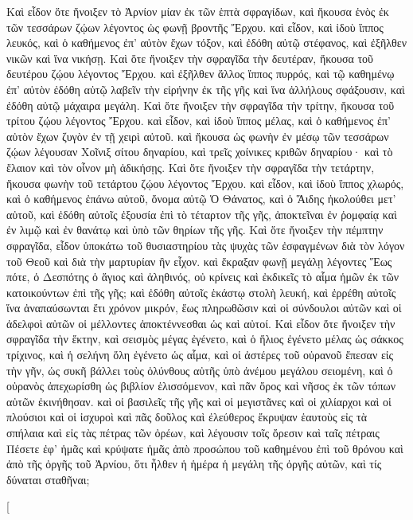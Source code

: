 \begin{pages}
    \begin{Rightside}
        \beginnumbering
		Καὶ εἶδον ὅτε ἤνοιξεν τὸ Ἀρνίον μίαν ἐκ τῶν ἑπτὰ σφραγίδων, καὶ ἤκουσα ἑνὸς ἐκ τῶν τεσσάρων ζῴων λέγοντος ὡς φωνῇ βροντῆς Ἔρχου. καὶ εἶδον, καὶ ἰδοὺ ἵππος λευκός, καὶ ὁ καθήμενος ἐπ’ αὐτὸν ἔχων τόξον, καὶ ἐδόθη αὐτῷ στέφανος, καὶ ἐξῆλθεν νικῶν καὶ ἵνα νικήσῃ.
		\pend
		\pstart
		Καὶ ὅτε ἤνοιξεν τὴν σφραγῖδα τὴν δευτέραν, ἤκουσα τοῦ δευτέρου ζῴου λέγοντος Ἔρχου. καὶ ἐξῆλθεν ἄλλος ἵππος πυρρός, καὶ τῷ καθημένῳ ἐπ’ αὐτὸν ἐδόθη αὐτῷ λαβεῖν τὴν εἰρήνην ἐκ τῆς γῆς καὶ ἵνα ἀλλήλους σφάξουσιν, καὶ ἐδόθη αὐτῷ μάχαιρα μεγάλη.
		\pend
		\pstart
		Καὶ ὅτε ἤνοιξεν τὴν σφραγῖδα τὴν τρίτην, ἤκουσα τοῦ τρίτου ζῴου λέγοντος Ἔρχου. καὶ εἶδον, καὶ ἰδοὺ ἵππος μέλας, καὶ ὁ καθήμενος ἐπ’ αὐτὸν ἔχων ζυγὸν ἐν τῇ χειρὶ αὐτοῦ. καὶ ἤκουσα ὡς φωνὴν ἐν μέσῳ τῶν τεσσάρων ζῴων λέγουσαν Χοῖνιξ σίτου δηναρίου, καὶ τρεῖς χοίνικες κριθῶν δηναρίου· καὶ τὸ ἔλαιον καὶ τὸν οἶνον μὴ ἀδικήσῃς. 
		\pend
		\pstart
		Καὶ ὅτε ἤνοιξεν τὴν σφραγῖδα τὴν τετάρτην, ἤκουσα φωνὴν τοῦ τετάρτου ζῴου λέγοντος Ἔρχου. καὶ εἶδον, καὶ ἰδοὺ ἵππος χλωρός, καὶ ὁ καθήμενος ἐπάνω αὐτοῦ, ὄνομα αὐτῷ Ὁ Θάνατος, καὶ ὁ Ἅιδης ἠκολούθει μετ’ αὐτοῦ, καὶ ἐδόθη αὐτοῖς ἐξουσία ἐπὶ τὸ τέταρτον τῆς γῆς, ἀποκτεῖναι ἐν ῥομφαίᾳ καὶ ἐν λιμῷ καὶ ἐν θανάτῳ καὶ ὑπὸ τῶν θηρίων τῆς γῆς.
		\pend
		\pstart
		Καὶ ὅτε ἤνοιξεν τὴν πέμπτην σφραγῖδα, εἶδον ὑποκάτω τοῦ θυσιαστηρίου τὰς ψυχὰς τῶν ἐσφαγμένων διὰ τὸν λόγον τοῦ Θεοῦ καὶ διὰ τὴν μαρτυρίαν ἣν εἶχον. καὶ ἔκραξαν φωνῇ μεγάλῃ λέγοντες Ἕως πότε, ὁ Δεσπότης ὁ ἅγιος καὶ ἀληθινός, οὐ κρίνεις καὶ ἐκδικεῖς τὸ αἷμα ἡμῶν ἐκ τῶν κατοικούντων ἐπὶ τῆς γῆς; καὶ ἐδόθη αὐτοῖς ἑκάστῳ στολὴ λευκή, καὶ ἐρρέθη αὐτοῖς ἵνα ἀναπαύσωνται ἔτι χρόνον μικρόν, ἕως πληρωθῶσιν καὶ οἱ σύνδουλοι αὐτῶν καὶ οἱ ἀδελφοὶ αὐτῶν οἱ μέλλοντες ἀποκτέννεσθαι ὡς καὶ αὐτοί.
		\pend
		\pstart
		Καὶ εἶδον ὅτε ἤνοιξεν τὴν σφραγῖδα τὴν ἕκτην, καὶ σεισμὸς μέγας ἐγένετο, καὶ ὁ ἥλιος ἐγένετο μέλας ὡς σάκκος τρίχινος, καὶ ἡ σελήνη ὅλη ἐγένετο ὡς αἷμα, καὶ οἱ ἀστέρες τοῦ οὐρανοῦ ἔπεσαν εἰς τὴν γῆν, ὡς συκῆ βάλλει τοὺς ὀλύνθους αὐτῆς ὑπὸ ἀνέμου μεγάλου σειομένη, καὶ ὁ οὐρανὸς ἀπεχωρίσθη ὡς βιβλίον ἑλισσόμενον, καὶ πᾶν ὄρος καὶ νῆσος ἐκ τῶν τόπων αὐτῶν ἐκινήθησαν. 
		\pend
		\pstart
		καὶ οἱ βασιλεῖς τῆς γῆς καὶ οἱ μεγιστᾶνες καὶ οἱ χιλίαρχοι καὶ οἱ πλούσιοι καὶ οἱ ἰσχυροὶ καὶ πᾶς δοῦλος καὶ ἐλεύθερος ἔκρυψαν ἑαυτοὺς εἰς τὰ σπήλαια καὶ εἰς τὰς πέτρας τῶν ὀρέων, καὶ λέγουσιν τοῖς ὄρεσιν καὶ ταῖς πέτραις Πέσετε ἐφ’ ἡμᾶς καὶ κρύψατε ἡμᾶς ἀπὸ προσώπου τοῦ καθημένου ἐπὶ τοῦ θρόνου καὶ ἀπὸ τῆς ὀργῆς τοῦ Ἀρνίου, ὅτι ἦλθεν ἡ ἡμέρα ἡ μεγάλη τῆς ὀργῆς αὐτῶν, καὶ τίς δύναται σταθῆναι;
		\pend
        \endnumbering
    \end{Rightside}
    \begin{Leftside}
        \beginnumbering
        \pstart[

\end{Leftside}
\end{pages}
